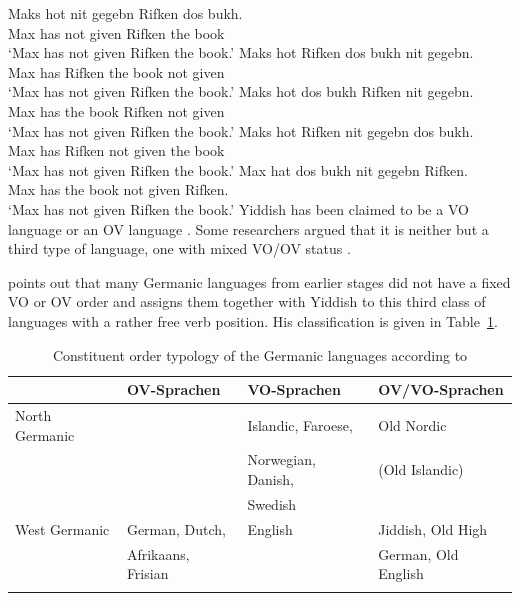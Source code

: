 \eal
\label{ex-yiddish-vo-ov}
\ex
\gll Maks hot nit gegebn Rifken dos bukh.\\
     Max  has not given  Rifken the book\\\yiddish
\glt `Max has not given Rifken the book.' 
\ex 
\gll Maks hot Rifken dos bukh nit gegebn.\\
     Max  has Rifken the book not given\\
\glt `Max has not given Rifken the book.'
\ex
\gll Maks hot dos bukh Rifken nit gegebn.\\
     Max  has the book Rifken not given\\
\glt `Max has not given Rifken the book.'
\ex
\gll Maks hot Rifken nit gegebn dos bukh.\\
     Max  has Rifken not given  the book\\
\glt `Max has not given Rifken the book.'
\ex
\glt Max hat dos bukh nit gegebn Rifken.\\
     Max has the book not given  Rifken.\\
\glt `Max has not given Rifken the book.'
\zl
Yiddish has been claimed to be a VO language
\parencites[]{dBMvW86a}[]{Diesing97a}{Sadock98a-u} or an OV
language \parencites{Hall79a-u}[\iaddpages]{Vikner2001a-u}. Some researchers argued that it is
neither but a third type of language, one with mixed VO/OV status \parencites{Santorini93a}[]{Schallert2007a}[]{Haider2010a}{Haider2020a}.

\citet[Section~2.5]{Schallert2007a} points out that many Germanic languages from earlier stages did not have a
fixed VO or OV order and assigns them together with Yiddish to this third class of languages with a
rather free verb position. His classification is given in Table~\ref{table-VO-OV}.
 
\begin{table}
\begin{tabular}{llll}\lsptoprule
               & OV-Sprachen        & VO-Sprachen        & OV/VO-Sprachen\\\midrule
North Germanic &                    & Islandic, Faroese, & Old Nordic \\
               &                    & Norwegian, Danish, & (Old Islandic)\\
               &                    & Swedish            &\\
West Germanic  & German, Dutch,     & English            & Jiddish, Old High \\
               & Afrikaans, Frisian &                    & German, Old English\\
\lspbottomrule
\end{tabular}
\caption{Constituent order typology of the Germanic languages according to \citet[]{Schallert2007a}}\label{table-VO-OV}
\end{table}


